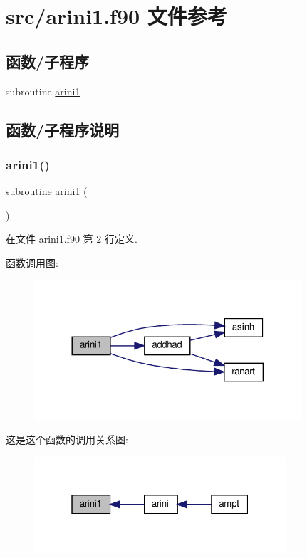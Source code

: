 \hypertarget{arini1_8f90}{}\section{src/arini1.f90 文件参考}
\label{arini1_8f90}
\subsection*{函数/子程序}
\begin{DoxyCompactItemize}
\item 
subroutine \mbox{\hyperlink{arini1_8f90_aef7add123b7de9c5ccaecc6a5143ad4c}{arini1}}
\end{DoxyCompactItemize}


\subsection{函数/子程序说明}
\mbox{\label{arini1_8f90_aef7add123b7de9c5ccaecc6a5143ad4c}} 
\subsubsection{\texorpdfstring{arini1()}{arini1()}}
{\footnotesize\ttfamily subroutine arini1 (\begin{DoxyParamCaption}{ }\end{DoxyParamCaption})}



在文件 arini1.\+f90 第 2 行定义.

函数调用图\+:
\nopagebreak
\begin{figure}[H]
\begin{center}
\leavevmode
\includegraphics[width=281pt]{arini1_8f90_aef7add123b7de9c5ccaecc6a5143ad4c_cgraph}
\end{center}
\end{figure}
这是这个函数的调用关系图\+:
\nopagebreak
\begin{figure}[H]
\begin{center}
\leavevmode
\includegraphics[width=265pt]{arini1_8f90_aef7add123b7de9c5ccaecc6a5143ad4c_icgraph}
\end{center}
\end{figure}
